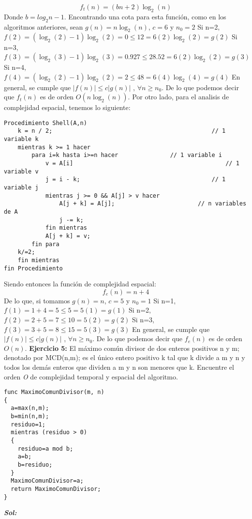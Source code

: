 \documentclass[12pt, letterpaper, twoside]{article}
\begin{document}
\[f_{t}(n) = (bn + 2)\log_{2}(n)\]
Donde $b = log_{2}n - 1$.
\newline
Encontrando una cota para esta función, como en los algoritmos anteriores, sean $g(n)=n\log_{2}(n)$, $c=6$ y $n_{0}=2$\newline
Si n=2,
\center$f(2)=(\log_{2}(2)-1)\log_{2}(2)=0\leq12=6(2)\log_{2}(2)=g(2)$
\justify
Si n=3,
\center$f(3)=(\log_{2}(3)-1)\log_{2}(3)=0.927\leq28.52=6(2)\log_{2}(2)=g(3)$
\justify
Si n=4,
\center$f(4)=(\log_{2}(2)-1)\log_{2}(2)=2\leq48=6(4)\log_{2}(4)=g(4)$
\justify
En general, se cumple que
\center$|f(n)|\leq c|g(n)|$ , $\forall n\geq n_{0}$.
\justify
De lo que podemos decir que $f_{t}(n)$ es de orden $O(n\log_{2}(n))$.
\newline 
Por otro lado, para el analisis de complejidad espacial, tenemos lo siguiente:
\begin{lstlisting}
Procedimiento Shell(A,n)
	k = n / 2;												// 1 variable k
	mientras k >= 1 hacer
		para i=k hasta i>=n hacer				// 1 variable i
			v = A[i]											// 1 variable v
			j = i - k;										// 1 variable j
			mientras j >= 0 && A[j] > v hacer
				A[j + k] = A[j];						// n variables de A
				j -= k;
			fin mientras
			A[j + k] = v;
		fin para
	k/=2;
	fin mientras
fin Procedimiento
\end{lstlisting}
Siendo entonces la función de complejidad espacial:
\[f_{e}(n)=n+4\]
De lo que, si tomamos $g(n)=n$, $c=5$ y $n_{0}=1$
\newline
Si n=1,
\center$f(1)=1+4=5\leq 5=5(1)=g(1)$
\justify
Si n=2,
\center$f(2)=2+5=7\leq 10=5(2)=g(2)$
\justify
Si n=3,
\center$f(3)=3+5=8\leq 15=5(3)=g(3)$
\justify
En general, se cumple que
\center$|f(n)|\leq c|g(n)|$ , $\forall n\geq n_{0}$.
\justify
De lo que podemos decir que $f_{e}(n)$ es de orden $O(n)$.
\newpage
\textbf{Ejercicio 5:} El máximo común divisor de dos enteros positivos n y m; denotado por MCD(n,m); es el único entero positivo k tal que k divide a m y n y todos los demás enteros que dividen a m y n son menores que k. Encuentre el orden \textit{O} de complejidad temporal y espacial del algoritmo.
\begin{lstlisting}
func MaximoComunDivisor(m, n)
{
  a=max(n,m);
  b=min(n,m);
  residuo=1;
  mientras (residuo > 0)
  {
    residuo=a mod b;
    a=b;
    b=residuo;
  }
  MaximoComunDivisor=a;
  return MaximoComunDivisor;
}
\end{lstlisting}
\justify
\textbf{\textit{Sol:}}
\end{document}
